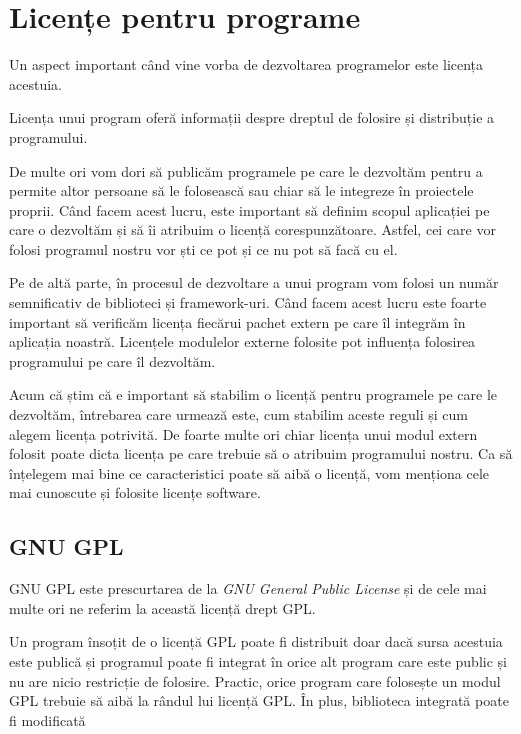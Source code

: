 \section{Licențe pentru programe}
\label{sec:appdev:license}

Un aspect important când vine vorba de dezvoltarea programelor este
licența acestuia.

Licența unui program oferă informații despre dreptul de folosire și distribuție
a programului.

De multe ori vom dori să publicăm programele pe care le dezvoltăm pentru a
permite altor persoane să le folosească sau chiar să le integreze în proiectele
proprii. Când facem acest lucru, este important să definim scopul aplicației pe
care o dezvoltăm și să îi atribuim o licență corespunzătoare. Astfel, cei care
vor folosi programul nostru vor ști ce pot și ce nu pot să facă cu el.

Pe de altă parte, în procesul de dezvoltare a unui program vom folosi un număr
semnificativ de biblioteci și framework-uri. Când facem acest lucru este foarte
important să verificăm licența fiecărui pachet extern pe care îl integrăm în
aplicația noastră. Licențele modulelor externe folosite pot influența folosirea
programului pe care îl dezvoltăm.

Acum că știm că e important să stabilim o licență pentru programele pe care le
dezvoltăm, întrebarea care urmează este, cum stabilim aceste reguli și cum
alegem licența potrivită. De foarte multe ori chiar licența unui modul extern
folosit poate dicta licența pe care trebuie să o atribuim programului nostru. Ca
să înțelegem mai bine ce caracteristici poate să aibă o licență, vom menționa
cele mai cunoscute și folosite licențe software.

\subsection{GNU GPL}
\label{sec:appdev-licensing-gpl}

GNU  GPL  este prescurtarea de la \textit{GNU General Public License} și de cele mai multe
ori ne referim la această licență drept GPL.

Un program însoțit de o licență GPL poate fi distribuit doar dacă sursa acestuia
este publică și programul poate fi integrat în orice alt program care este
public și nu are nicio restricție de folosire. Practic, orice program care
folosește un modul GPL trebuie să aibă la rândul lui licență GPL. În plus,
biblioteca integrată poate fi modificată


